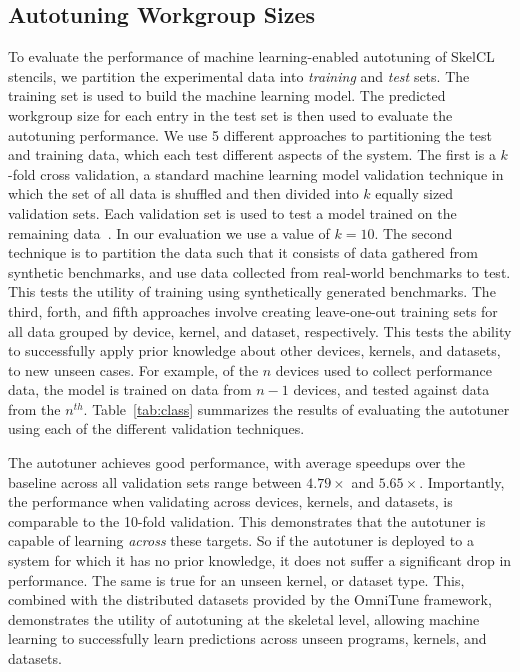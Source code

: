 \documentclass[nonatbib,preprint,nocopyrightspace,9pt]{sigplanconf}
\begin{document}
\subsection{Autotuning Workgroup Sizes}

To evaluate the performance of machine learning-enabled autotuning of
SkelCL stencils, we partition the experimental data into
\emph{training} and \emph{test} sets. The training set is used to
build the machine learning model. The predicted workgroup size for
each entry in the test set is then used to evaluate the autotuning
performance. We use 5 different approaches to partitioning the test
and training data, which each test different aspects of the
system. The first is a $k$-fold cross validation, a standard machine
learning model validation technique in which the set of all data is
shuffled and then divided into $k$ equally sized validation sets. Each
validation set is used to test a model trained on the remaining
data~\cite{Han2011}. In our evaluation we use a value of $k=10$. The
second technique is to partition the data such that it consists of
data gathered from synthetic benchmarks, and use data collected from
real-world benchmarks to test. This tests the utility of training
using synthetically generated benchmarks. The third, forth, and fifth
approaches involve creating leave-one-out training sets for all data
grouped by device, kernel, and dataset, respectively. This tests the
ability to successfully apply prior knowledge about other devices,
kernels, and datasets, to new unseen cases. For example, of the $n$
devices used to collect performance data, the model is trained on data
from $n-1$ devices, and tested against data from the
$n^{th}$. Table~\ref{tab:class} summarizes the results of evaluating
the autotuner using each of the different validation techniques.

The autotuner achieves good performance, with average speedups over
the baseline across all validation sets range between $4.79\times$ and
$5.65\times$. Importantly, the performance when validating across
devices, kernels, and datasets, is comparable to the 10-fold
validation. This demonstrates that the autotuner is capable of
learning \emph{across} these targets. So if the autotuner is deployed
to a system for which it has no prior knowledge, it does not suffer a
significant drop in performance. The same is true for an unseen
kernel, or dataset type. This, combined with the distributed datasets
provided by the OmniTune framework, demonstrates the utility of
autotuning at the skeletal level, allowing machine learning to
successfully learn predictions across unseen programs, kernels, and
datasets.
\end{document}

